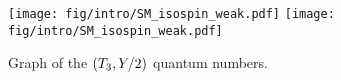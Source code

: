 
\begin{figure*}[p]
  \vspace*{-10mm}
  \centerline{
    \texttt{[image: fig/intro/SM\_isospin\_weak.pdf]}
    \texttt{[image: fig/intro/SM\_isospin\_weak.pdf]}
  }
  \caption{
Graph of the $(T_3,{Y}/2)$ quantum numbers.
  }\label{fig:SM_quantum_numbers_fermions}
  \vspace*{-6mm}
\end{figure*}
